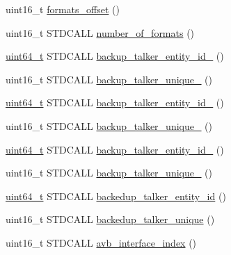 \begin{DoxyCompactItemize}
uint16\+\_\+t \hyperlink{classavdecc__lib_1_1stream__output__descriptor__response__imp_a7035090487c372efc97d56ad77148cfc}{formats\+\_\+offset} ()
\item 
uint16\+\_\+t S\+T\+D\+C\+A\+LL \hyperlink{classavdecc__lib_1_1stream__output__descriptor__response__imp_a159e8e8c593b548faf249fc404afa7e3}{number\+\_\+of\+\_\+formats} ()
\item 
\hyperlink{parse_8c_aec6fcb673ff035718c238c8c9d544c47}{uint64\+\_\+t} S\+T\+D\+C\+A\+LL \hyperlink{classavdecc__lib_1_1stream__output__descriptor__response__imp_a7069339e1e712c1ffb3f7627c6e731fc}{backup\+\_\+talker\+\_\+entity\+\_\+id\+\_} ()
\item 
uint16\+\_\+t S\+T\+D\+C\+A\+LL \hyperlink{classavdecc__lib_1_1stream__output__descriptor__response__imp_a0d5775425dd9b5b953299e00f4554e31}{backup\+\_\+talker\+\_\+unique\+\_} ()
\item 
\hyperlink{parse_8c_aec6fcb673ff035718c238c8c9d544c47}{uint64\+\_\+t} S\+T\+D\+C\+A\+LL \hyperlink{classavdecc__lib_1_1stream__output__descriptor__response__imp_ab15c1e07ce662d441f84bbf57448ce32}{backup\+\_\+talker\+\_\+entity\+\_\+id\+\_} ()
\item 
uint16\+\_\+t S\+T\+D\+C\+A\+LL \hyperlink{classavdecc__lib_1_1stream__output__descriptor__response__imp_ae7be6e3982ff7244a985c99688af1cc8}{backup\+\_\+talker\+\_\+unique\+\_} ()
\item 
\hyperlink{parse_8c_aec6fcb673ff035718c238c8c9d544c47}{uint64\+\_\+t} S\+T\+D\+C\+A\+LL \hyperlink{classavdecc__lib_1_1stream__output__descriptor__response__imp_a68f720a7cb3cad6ea7a9fe5611d1d1b3}{backup\+\_\+talker\+\_\+entity\+\_\+id\+\_} ()
\item 
uint16\+\_\+t S\+T\+D\+C\+A\+LL \hyperlink{classavdecc__lib_1_1stream__output__descriptor__response__imp_ad7ef80dad6b6116492b964c9e694e8c4}{backup\+\_\+talker\+\_\+unique\+\_} ()
\item 
\hyperlink{parse_8c_aec6fcb673ff035718c238c8c9d544c47}{uint64\+\_\+t} S\+T\+D\+C\+A\+LL \hyperlink{classavdecc__lib_1_1stream__output__descriptor__response__imp_a1a355b30bce8e2eda6f2cc774290c00d}{backedup\+\_\+talker\+\_\+entity\+\_\+id} ()
\item 
uint16\+\_\+t S\+T\+D\+C\+A\+LL \hyperlink{classavdecc__lib_1_1stream__output__descriptor__response__imp_a8e27a809269c66079498002b98a1f492}{backedup\+\_\+talker\+\_\+unique} ()
\item 
uint16\+\_\+t S\+T\+D\+C\+A\+LL \hyperlink{classavdecc__lib_1_1stream__output__descriptor__response__imp_ae7d22ba1a477c0d8f54d85404b2e4d08}{avb\+\_\+interface\+\_\+index} ()

\end{DoxyCompactItemize}
